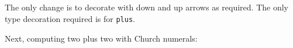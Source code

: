\begin{fence}
\begin{code}
\\
\>[10][@{}l@{\AgdaIndent{0}}]%
\>[12]\AgdaSpace{}%
\AgdaSymbol{(}\AgdaSpace{}%
\AgdaSpace{}%
\AgdaSpace{}%
\AgdaSpace{}%
\AgdaSymbol{)}\<%
\\
%
\\[\AgdaEmptyExtraSkip]%
\>[0]\AgdaSpace{}%
\AgdaSymbol{:}\AgdaSpace{}%
\<%
\\
\>[0]\AgdaSpace{}%
\AgdaSymbol{=}\AgdaSpace{}%
\AgdaSpace{}%
\AgdaSpace{}%
\AgdaSpace{}%
\AgdaSpace{}%
\<%
\end{code}
\end{fence}

The only change is to decorate with down and up arrows as required. The
only type decoration required is for \texttt{plus}.

Next, computing two plus two with Church numerals:

